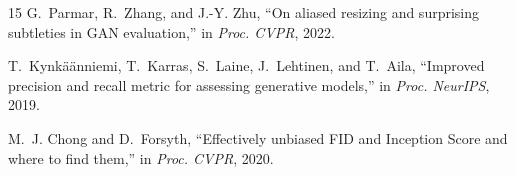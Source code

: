 \documentclass[conference]{IEEEtran}
\begin{document}
\begin{thebibliography}{15}
G.~Parmar, R.~Zhang, and J.-Y. Zhu, ``On aliased resizing and surprising subtleties in GAN evaluation,'' in
\emph{Proc. CVPR}, 2022.

T.~Kynkäänniemi, T.~Karras, S.~Laine, J.~Lehtinen, and T.~Aila, ``Improved precision and recall metric for
assessing generative models,'' in \emph{Proc. NeurIPS}, 2019.

M.~J. Chong and D.~Forsyth, ``Effectively unbiased FID and Inception Score and where to find them,'' in
\emph{Proc. CVPR}, 2020.

\end{thebibliography}
\end{document}
